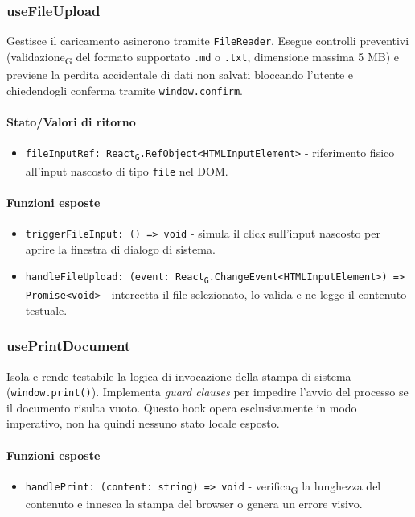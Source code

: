 \documentclass[11pt,a4paper]{article}
\newcommand{\gls}[1]{#1\textsubscript{G}}
\begin{document}
\subsubsection{useFileUpload}
Gestisce il caricamento asincrono tramite \texttt{FileReader}. Esegue controlli preventivi (\gls{validazione} del formato supportato \texttt{.md} o \texttt{.txt}, dimensione massima 5 MB) e previene la perdita accidentale di dati non salvati bloccando l'utente e chiedendogli conferma tramite \texttt{window.confirm}.


\paragraph{Stato/Valori di ritorno}
\begin{itemize}
    \item \texttt{fileInputRef: \gls{React}.RefObject<HTMLInputElement>} - riferimento fisico all'input nascosto di tipo \texttt{file} nel DOM.
\end{itemize}

\paragraph{Funzioni esposte}
\begin{itemize}
    \item \texttt{triggerFileInput: () => void} - simula il click sull'input nascosto per aprire la finestra di dialogo di sistema.
    \item \texttt{handleFileUpload: (event: \gls{React}.ChangeEvent<HTMLInputElement>) => Promise<void>} - intercetta il file selezionato, lo valida e ne legge il contenuto testuale.
\end{itemize}


\subsubsection{usePrintDocument}
Isola e rende testabile la logica di invocazione della stampa di sistema (\texttt{window.print()}). Implementa \textit{guard clauses} per impedire l'avvio del processo se il documento risulta vuoto.
Questo hook opera esclusivamente in modo imperativo, non ha quindi nessuno stato locale esposto.


\paragraph{Funzioni esposte}
\begin{itemize}
    \item \texttt{handlePrint: (content: string) => void} - \gls{verifica} la lunghezza del contenuto e innesca la stampa del browser o genera un errore visivo.
\end{itemize}
\end{document}
